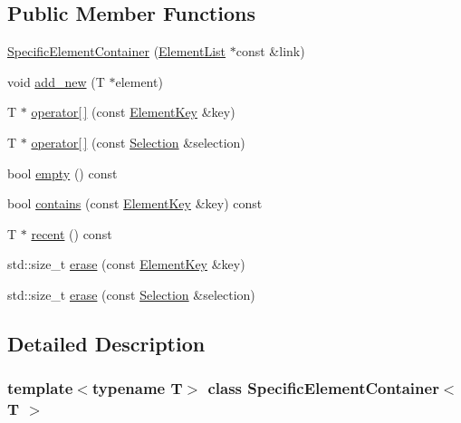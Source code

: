 \subsection*{Public Member Functions}
\begin{DoxyCompactItemize}
\item 
\hyperlink{class_specific_element_container_a3455c240bf203136bf88cfbb56d5ed2c}{Specific\+Element\+Container} (\hyperlink{class_element_list}{Element\+List} $\ast$const \&link)
\item 
void \hyperlink{class_specific_element_container_a6a3c2ba0b46445d1504489d5c2ef3530}{add\+\_\+new} (T $\ast$element)
\item 
T $\ast$ \hyperlink{class_specific_element_container_ae61c1d81ff22ca1bb4d37f0917710a4b}{operator\mbox{[}$\,$\mbox{]}} (const \hyperlink{_graphical_element_8h_ade5fd6c85839a416577ff9de1605141e}{Element\+Key} \&key)
\item 
T $\ast$ \hyperlink{class_specific_element_container_a6a024841f2b43dc4e3c467d401434d28}{operator\mbox{[}$\,$\mbox{]}} (const \hyperlink{struct_selection}{Selection} \&selection)
\item 
bool \hyperlink{class_specific_element_container_aead401f8325d8f15b5d63896f146d46b}{empty} () const
\item 
bool \hyperlink{class_specific_element_container_a55f9c50b8520d9e89aa11a31be58a0f0}{contains} (const \hyperlink{_graphical_element_8h_ade5fd6c85839a416577ff9de1605141e}{Element\+Key} \&key) const
\item 
T $\ast$ \hyperlink{class_specific_element_container_a700ee4826baf3ab9735c2ae5c52bcaf3}{recent} () const
\item 
std\+::size\+\_\+t \hyperlink{class_specific_element_container_ae08e116cb7638a4d4d10a830185f502e}{erase} (const \hyperlink{_graphical_element_8h_ade5fd6c85839a416577ff9de1605141e}{Element\+Key} \&key)
\item 
std\+::size\+\_\+t \hyperlink{class_specific_element_container_a2d5e472917fc500714586e9c115f8da6}{erase} (const \hyperlink{struct_selection}{Selection} \&selection)
\end{DoxyCompactItemize}


\subsection{Detailed Description}
\subsubsection*{template$<$typename T$>$\newline
class Specific\+Element\+Container$<$ T $>$}



